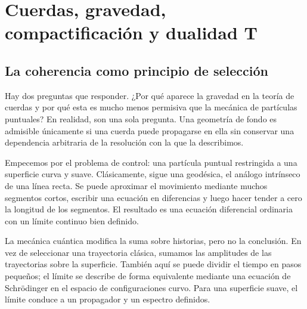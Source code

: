 \chapter{Cuerdas, gravedad, compactificación y dualidad T}


\section{La coherencia como principio de selección}

Hay dos preguntas que responder. ¿Por qué aparece la gravedad en la teoría de cuerdas y por qué esta es mucho menos permisiva que la mecánica de partículas puntuales? En realidad, son una sola pregunta. Una geometría de fondo es admisible únicamente si una cuerda puede propagarse en ella sin conservar una dependencia arbitraria de la resolución con la que la describimos.

Empecemos por el problema de control: una partícula puntual restringida a una superficie curva y suave. Clásicamente, sigue una geodésica, el análogo intrínseco de una línea recta. Se puede aproximar el movimiento mediante muchos segmentos cortos, escribir una ecuación en diferencias y luego hacer tender a cero la longitud de los segmentos. El resultado es una ecuación diferencial ordinaria con un límite continuo bien definido.

La mecánica cuántica modifica la suma sobre historias, pero no la conclusión. En vez de seleccionar una trayectoria clásica, sumamos las amplitudes de las trayectorias sobre la superficie. También aquí se puede dividir el tiempo en pasos pequeños; el límite se describe de forma equivalente mediante una ecuación de Schr\"odinger en el espacio de configuraciones curvo. Para una superficie suave, el límite conduce a un propagador y un espectro definidos.

